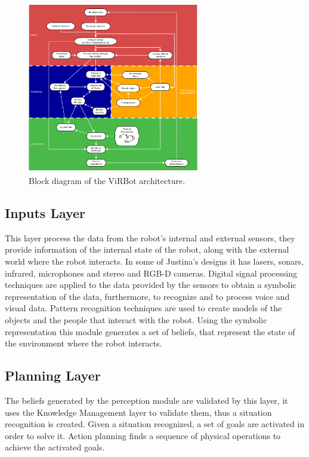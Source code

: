 \documentclass{llncs}
\begin{document}
\begin{figure}[h]
	\centering
	\includegraphics[angle=0, height=7.5cm, width=7.5cm]{Figures/ViRBot.png}
	\caption{Block diagram of the ViRBot architecture.}
	\label{fig:virbot}
\end{figure}


\subsection{Inputs Layer}

This layer process the data from the robot's internal and external sensors, they provide information of the internal state of the robot, along with the external world where the robot interacts.
In some of Justina's designs it has lasers, sonars, infrared, microphones and stereo and RGB-D cameras.
Digital signal processing techniques are applied to the data provided by the sensors to obtain a symbolic representation of the data, furthermore, to recognize and to process voice and visual data.
Pattern recognition techniques are used to create models of the objects and the people that interact with the robot.
Using the symbolic representation this module generates a set of beliefs, that represent the state of the environment where the robot interacts.


\subsection{Planning Layer}

The beliefs generated by the perception module are validated by this layer, it uses the Knowledge Management layer to validate them, thus a situation recognition is created. 
Given a situation recognized, a set of goals are activated in order to solve it.
Action planning finds a sequence of physical operations to achieve the activated goals.
\end{document}
